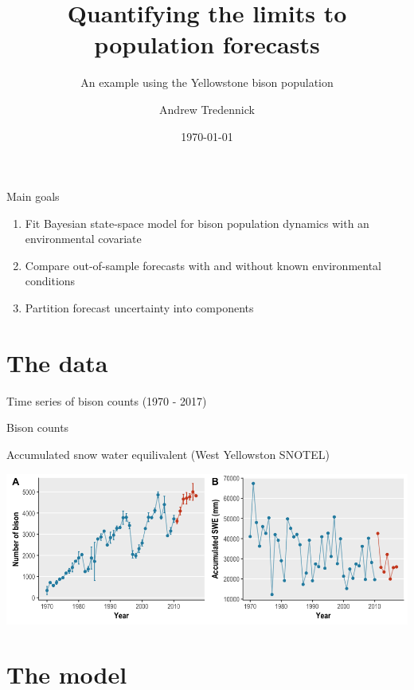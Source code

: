 \documentclass[11pt, compress, aspectratio=1610]{beamer}
\title{Quantifying the limits to population forecasts}
\subtitle{An example using the Yellowstone bison population}
\date{\today}
\author{Andrew Tredennick}
\institute{Utah State University}
\providecommand{\tightlist}{%
  \setlength{\itemsep}{0pt}\setlength{\parskip}{0pt}}
\begin{document}
\maketitle

\begin{frame}{%
\protect\hypertarget{main-goals}{%
Main goals}}

\begin{enumerate}
[1.]
\tightlist
\item
  Fit Bayesian state-space model for bison population dynamics
  \alert{with} an environmental covariate
\item
  Compare out-of-sample forecasts with and without known environmental
  conditions
\item
  Partition forecast uncertainty into components
\end{enumerate}

\end{frame}

\hypertarget{the-data}{%
\section{The data}\label{the-data}}

\begin{frame}{%
\protect\hypertarget{time-series-of-bison-counts-1970---2017}{%
Time series of bison counts (1970 - 2017)}}

\begin{description}
\tightlist
\item[Response]
Bison counts
\item[Covariate]
Accumulated snow water equilivalent (West Yellowston SNOTEL)
\end{description}

\includegraphics[width=\textwidth]{../figures/bison_data_plots.png}

\end{frame}

\hypertarget{the-model}{%
\section{The model}\label{the-model}}
\end{document}
